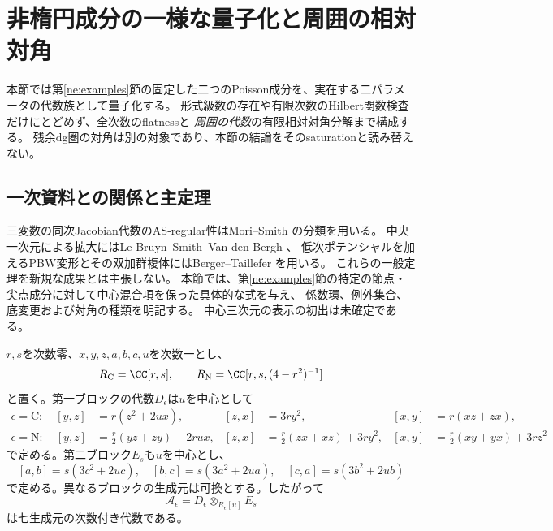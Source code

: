 \section{非楕円成分の一様な量子化と周囲の相対対角}
\label{nq:sec:quantization}
本節では第\ref{ne:examples}節の固定した二つのPoisson成分を、実在する二パラメータの代数族として量子化する。
形式級数の存在や有限次数のHilbert関数検査だけにとどめず、全次数のflatnessと
\emph{周囲の代数}の有限相対対角分解まで構成する。
残余dg圏の対角は別の対象であり、本節の結論をそのsaturationと読み替えない。

\subsection{一次資料との関係と主定理}
三変数の同次Jacobian代数のAS-regular性はMori--Smith
\cite[Theorem 4.2, Lemma 4.1]{PMoriSmith}の分類を用いる。
中央一次元による拡大にはLe Bruyn--Smith--Van den Bergh
\cite[Theorem 2.6, Corollary 2.7, Theorem 3.1.3]{LBSVNE12}、
低次ポテンシャルを加えるPBW変形とその双加群複体にはBerger--Taillefer
\cite[Theorems 3.1 and 3.6]{PBergerTaillefer}を用いる。
これらの一般定理を新規な成果とは主張しない。
本節では、第\ref{ne:examples}節の特定の節点・尖点成分に対して中心混合項を保った具体的な式を与え、
係数環、例外集合、底変更および対角の種類を明記する。
中心三次元の表示の初出は未確定である。

$r,s$を次数零、$x,y,z,a,b,c,u$を次数一とし、
\begin{equation}
 R_{\mathrm C}=\CC[r,s],\qquad
 R_{\mathrm N}=\CC[r,s,(4-r^2)^{-1}]
\end{equation}
と置く。第一ブロックの代数$D_\epsilon$は$u$を中心として
\begin{align}
 \epsilon=\mathrm C:\quad
 [y,z]&=r(z^2+2ux),&[z,x]&=3ry^2,&[x,y]&=r(xz+zx),
 \label{nq:eq:cusp}\\
 \epsilon=\mathrm N:\quad
 [y,z]&=\tfrac r2(yz+zy)+2rux,&
 [z,x]&=\tfrac r2(zx+xz)+3ry^2,&
 [x,y]&=\tfrac r2(xy+yx)+3rz^2
 \label{nq:eq:node}
\end{align}
で定める。第二ブロック$E_s$も$u$を中心とし、
\begin{equation}\label{nq:eq:fermat}
 [a,b]=s(3c^2+2uc),\quad
 [b,c]=s(3a^2+2ua),\quad
 [c,a]=s(3b^2+2ub)
\end{equation}
で定める。異なるブロックの生成元は可換とする。したがって
\begin{equation}
 \mathcal A_\epsilon=D_\epsilon\otimes_{R_\epsilon[u]}E_s
\end{equation}
は七生成元の次数付き代数である。

